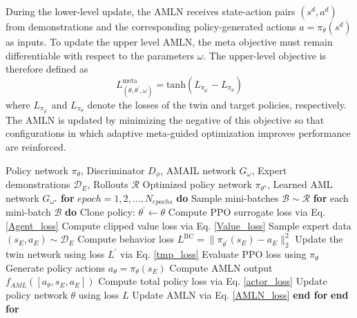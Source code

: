 \documentclass[journal]{IEEEtran}
\begin{document}
During the lower-level update, the AMLN receives state-action pairs $(s^d, a^d)$ from demonstrations and the corresponding policy-generated actions $a = \pi_\theta(s^d)$ as inputs. To update the upper level AMLN, the meta objective must remain differentiable with respect to the parameters $\omega$. The upper-level objective is therefore defined as
\begin{equation}
\label{AMLN_loss}
L^{\text{meta}}_{(\theta,\theta^{\prime},\omega)}= \text{tanh}(L_{\pi_{\theta^{\prime}}}-L_{\pi_{\theta}})
\end{equation}
where $L_{\pi_{\theta^{\prime}}}$ and $L_{\pi_{\theta}}$ denote the losses of the twin and target policies, respectively. The AMLN is updated by minimizing the negative of this objective so that configurations in which adaptive meta-guided optimization improves performance are reinforced.
\begin{algorithm}[H]
\caption{Hierarchical Adaptive Meta-Guided Policy Optimization}\label{alg:AML}
\begin{algorithmic}[1]
\REQUIRE Policy network $\pi_\theta$, Discriminator $D_\phi$, AMAIL network $G_\omega$, Expert demonstrations $\mathcal{D}_E$, Rollouts $\mathcal{R}$
\ENSURE Optimized policy network $\pi_{\theta^\star}$, Learned AML network $G_{\omega^\star}$
\STATE \textbf{for} $epoch = 1,2,...,N_{epochs}$ \textbf{do}
\STATE \hspace{0.5cm}Sample mini-batches $\mathcal{B} \sim \mathcal{R} $
\STATE \hspace{0.5cm}\textbf{for} each mini-batch $\mathcal{B}$ \textbf{do}
\STATE \hspace{1cm}Clone policy: $\theta^{\prime}\leftarrow \theta$
\STATE \hspace{1cm}Compute PPO surrogate loss via Eq. \eqref{Agent_loss}
\STATE \hspace{1cm}Compute clipped value loss via Eq. \eqref{Value_loss}
\STATE \hspace{1cm}Sample expert data $(s_E,a_E) \sim \mathcal{D}_E$
\STATE \hspace{1cm}Compute behavior loss $L^{\text{BC}}=\lVert \pi_{\theta^{\prime}}(s_E)-a_E \rVert_2^2$
\STATE \hspace{1cm}Update the twin network using loss $L^{\prime}$ via Eq. \eqref{tmp_loss}
\STATE \hspace{1cm}Evaluate PPO loss using $\pi_{\theta}$
\STATE \hspace{1cm}Generate policy actions $a_\theta=\pi_\theta(s_E)$
\STATE \hspace{1cm}Compute AMLN output $f_{AML}([a_\theta,s_E,a_E])$
\STATE \hspace{1cm}Compute total policy loss via Eq. \eqref{actor_loss}
\STATE \hspace{1cm}Update policy network $\theta$ using loss $L$
\STATE \hspace{1cm}Update AMLN via Eq. \eqref{AMLN_loss}
\STATE \hspace{0.5cm}\textbf{end for}
\STATE \textbf{end for}
\end{algorithmic}
\label{alg1}
\end{algorithm}
\end{document}
